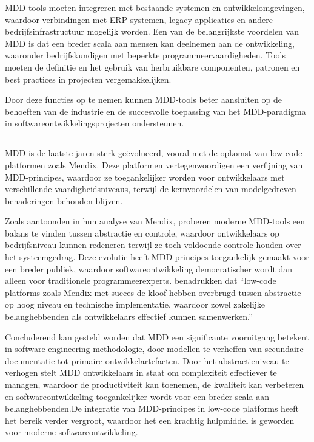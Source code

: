 \gls{MDD}-tools moeten integreren met bestaande systemen en ontwikkelomgevingen, waardoor verbindingen met ERP-systemen, legacy applicaties en andere bedrijfsinfrastructuur mogelijk worden. Een van de belangrijkste voordelen van \gls{MDD} is dat een breder scala aan mensen kan deelnemen aan de ontwikkeling, waaronder bedrijfskundigen met beperkte programmeervaardigheden. Tools moeten de definitie en het gebruik van herbruikbare componenten, patronen en best practices in projecten vergemakkelijken. 

Door deze functies op te nemen kunnen \gls{MDD}-tools beter aansluiten op de behoeften van de industrie en de succesvolle toepassing van het \gls{MDD}-paradigma in softwareontwikkelingsprojecten ondersteunen.

\subsection{}%
\gls{MDD} is de laatste jaren sterk geëvolueerd, vooral met de opkomst van low-code platformen zoals Mendix. Deze platformen vertegenwoordigen een verfijning van \gls{MDD}-principes, waardoor ze toegankelijker worden voor ontwikkelaars met verschillende vaardigheidsniveaus, terwijl de kernvoordelen van modelgedreven benaderingen behouden blijven.

Zoals \textcite{Henkel2010} aantoonden in hun analyse van Mendix, proberen moderne \gls{MDD}-tools een balans te vinden tussen abstractie en controle, waardoor ontwikkelaars op bedrijfsniveau kunnen redeneren terwijl ze toch voldoende controle houden over het systeemgedrag. Deze evolutie heeft \gls{MDD}-principes toegankelijk gemaakt voor een breder publiek, waardoor softwareontwikkeling democratischer wordt dan alleen voor traditionele programmeerexperts. \textcite{Henkel2010} benadrukken dat “low-code platforms zoals Mendix met succes de kloof hebben overbrugd tussen abstractie op hoog niveau en technische implementatie, waardoor zowel zakelijke belanghebbenden als ontwikkelaars effectief kunnen samenwerken.”

Concluderend kan gesteld worden dat \gls{MDD} een significante vooruitgang betekent in software engineering methodologie, door modellen te verheffen van secundaire documentatie tot primaire ontwikkelartefacten. Door het abstractieniveau te verhogen stelt \gls{MDD} ontwikkelaars in staat om complexiteit effectiever te managen, waardoor de productiviteit kan toenemen, de kwaliteit kan verbeteren en softwareontwikkeling toegankelijker wordt voor een breder scala aan belanghebbenden.De integratie van \gls{MDD}-principes in low-code platforms heeft het bereik verder vergroot, waardoor het een krachtig hulpmiddel is geworden voor moderne softwareontwikkeling.

